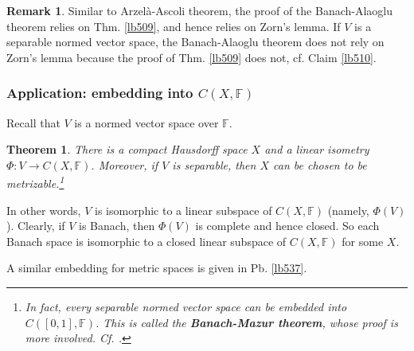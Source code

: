 \documentclass[12pt,b5paper,notitlepage]{article}
\theoremstyle{definition}
\newtheorem{rem}[df]{Remark}
\theoremstyle{plain}
\newtheorem{thm}[df]{Theorem}
\newcommand{\Fbb}{\mathbb F}
\numberwithin{equation}{section}
\begin{document}
\begin{rem}\label{lb525}
Similar to Arzel\`a-Ascoli theorem, the proof of the Banach-Alaoglu theorem relies on Thm. \ref{lb509}, and hence relies on Zorn's lemma. If $V$ is a separable normed vector space, the Banach-Alaoglu theorem does not rely on Zorn's lemma because the proof of Thm. \ref{lb509} does not, cf. Claim \ref{lb510}.
\end{rem}







\subsubsection{Application: embedding into $C(X,\Fbb)$}

Recall that $V$ is a normed vector space over $\Fbb$.





\begin{thm}\label{lb521}
There is a compact Hausdorff space $X$ and a linear isometry $\Phi:V\rightarrow C(X,\Fbb)$. Moreover, if $V$ is separable, then $X$ can be chosen to be metrizable.\footnote{In fact, every separable normed vector space can be embedded into $C([0,1],\Fbb)$. This is called the \textbf{Banach-Mazur theorem}, whose proof is more involved. Cf. \cite[Sec. 1.4]{AK}.} 
\end{thm}

In other words, $V$ is isomorphic to a linear subspace of $C(X,\Fbb)$ (namely, $\Phi(V)$). Clearly, if $V$ is Banach, then $\Phi(V)$ is complete and hence closed. So each Banach space is isomorphic to a closed linear subspace of $C(X,\Fbb)$ for some $X$.

A similar embedding for metric spaces is given in Pb. \ref{lb537}.
\end{document}
